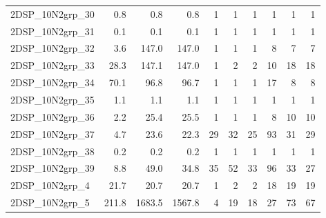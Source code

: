 \documentclass[a4paper,10pt]{article}
\theoremstyle{definition}
\begin{document}
\begin{table}[t]
\begin{scriptsize}
\begin{tabular*}{\textwidth}{@{}l@{\;\;\extracolsep{\fill}}rrrrrrrrr@{}}
 2DSP\_10N2grp\_30 & \num{   0.8} & \num{   0.8} & \num{   0.8} & \num{         1} & \num{         1} & \num{         1} & \num{         1} & \num{         1} & \num{         1}\\
 2DSP\_10N2grp\_31 & \num{   0.1} & \num{   0.1} & \num{   0.1} & \num{         1} & \num{         1} & \num{         1} & \num{         1} & \num{         1} & \num{         1}\\
 2DSP\_10N2grp\_32 & \num{   3.6} & \num{ 147.0} & \num{ 147.0} & \num{         1} & \num{         1} & \num{         1} & \num{         8} & \num{         7} & \num{         7}\\
 2DSP\_10N2grp\_33 & \num{  28.3} & \num{ 147.1} & \num{ 147.0} & \num{         1} & \num{         2} & \num{         2} & \num{        10} & \num{        18} & \num{        18}\\
 2DSP\_10N2grp\_34 & \num{  70.1} & \num{  96.8} & \num{  96.7} & \num{         1} & \num{         1} & \num{         1} & \num{        17} & \num{         8} & \num{         8}\\
 2DSP\_10N2grp\_35 & \num{   1.1} & \num{   1.1} & \num{   1.1} & \num{         1} & \num{         1} & \num{         1} & \num{         1} & \num{         1} & \num{         1}\\
 2DSP\_10N2grp\_36 & \num{   2.2} & \num{  25.4} & \num{  25.5} & \num{         1} & \num{         1} & \num{         1} & \num{         8} & \num{        10} & \num{        10}\\
 2DSP\_10N2grp\_37 & \num{   4.7} & \num{  23.6} & \num{  22.3} & \num{        29} & \num{        32} & \num{        25} & \num{        93} & \num{        31} & \num{        29}\\
 2DSP\_10N2grp\_38 & \num{   0.2} & \num{   0.2} & \num{   0.2} & \num{         1} & \num{         1} & \num{         1} & \num{         1} & \num{         1} & \num{         1}\\
 2DSP\_10N2grp\_39 & \num{   8.8} & \num{  49.0} & \num{  34.8} & \num{        35} & \num{        52} & \num{        33} & \num{        96} & \num{        33} & \num{        27}\\
  2DSP\_10N2grp\_4 & \num{  21.7} & \num{  20.7} & \num{  20.7} & \num{         1} & \num{         2} & \num{         2} & \num{        18} & \num{        19} & \num{        19}\\
  2DSP\_10N2grp\_5 & \num{ 211.8} & \num{1683.5} & \num{1567.8} & \num{         4} & \num{        19} & \num{        18} & \num{        27} & \num{        73} & \num{        67}\\

\end{tabular*}
\end{scriptsize}
\end{table}
\end{document}
